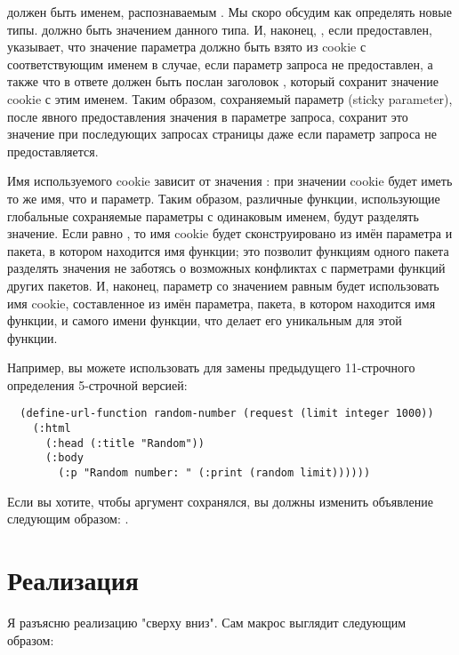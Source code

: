  должен быть именем, распознаваемым . Мы скоро
обсудим как определять новые типы.  должно быть значением данного
типа. И, наконец, , если предоставлен, указывает, что значение параметра
должно быть взято из cookie с соответствующим именем в случае, если параметр запроса не
предоставлен, а также что в ответе должен быть послан заголовок , который
сохранит значение cookie с этим именем. Таким образом, сохраняемый параметр (sticky
parameter), после явного предоставления значения в параметре запроса, сохранит это
значение при последующих запросах страницы даже если параметр запроса не предоставляется.

Имя используемого cookie зависит от значения : при значении 
cookie будет иметь то же имя, что и параметр. Таким образом, различные функции,
использующие глобальные сохраняемые параметры с одинаковым именем, будут разделять
значение. Если  равно , то имя cookie будет сконструировано
из имён параметра и пакета, в котором находится имя функции; это позволит функциям одного
пакета разделять значения не заботясь о возможных конфликтах с парметрами функций других
пакетов. И, наконец, параметр со значением  равным  будет
использовать имя cookie, составленное из имён параметра, пакета, в котором находится имя
функции, и самого имени функции, что делает его уникальным для этой функции.

Например, вы можете использовать  для замены предыдущего
11-строчного определения  5-строчной версией:

\begin{lstlisting}
  (define-url-function random-number (request (limit integer 1000))
    (:html
      (:head (:title "Random"))
      (:body
        (:p "Random number: " (:print (random limit))))))
\end{lstlisting}

Если вы хотите, чтобы аргумент  сохранялся, вы должны изменить объявление
 следующим образом: .

\section{Реализация}

Я разъясню реализацию  "сверху вниз". Сам макрос выглядит
следующим образом:

